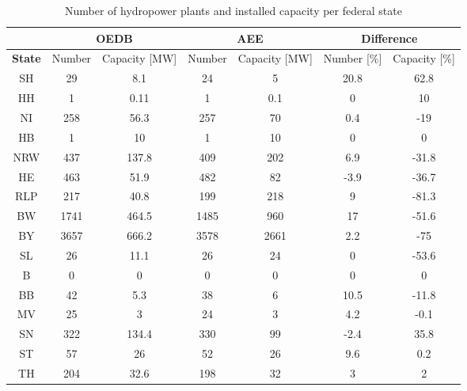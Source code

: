 \begin{table}
\footnotesize 
 \caption[Number of hydropower plants and installed capacity per federal state]{Number of hydropower plants and installed capacity per federal state \cite{oedb}\cite{aee}}
 \centering
 \label{oedb_aee_diff}
 \begin{tabular}{|c|cc|cc| cc|}
  \cline{2-7}
  \multicolumn{0}{c|}{} &\multicolumn{2}{|c}{\textbf{OEDB}}&\multicolumn{2}{|c|}{\textbf{AEE}}&\multicolumn{2}{c|}{\textbf{Difference}} \\
  \hline
  \textbf{State} & Number 	& 	Capacity [MW] 	&	Number 	& 	Capacity [MW] 	&	Number [\%] 	&	Capacity [\%] \\
  \hline
  SH	&	29	&	8.1		&	24	&	5		&	20.8		&	62.8	\\
  HH	&	1	&	0.11		&	1	&	0.1		&	0		&	10	\\
  NI	&	258	&	56.3		&	257	&	70		&	0.4		&	-19	\\
  HB	&	1	&	10		&	1	&	10		&	0		&	0	\\
  NRW	&	437	&	137.8		&	409	&	202		&	6.9		&	-31.8	\\
  HE	&	463	&	51.9		&	482	&	82		&	-3.9		&	-36.7	\\
  RLP	&	217	&	40.8		&	199	&	218		&	9		&	-81.3	\\
  BW	&	1741	&	464.5		&	1485	&	960		&	17		&	-51.6	\\	
  BY	&	3657	&	666.2		&	3578	&	2661		&	2.2		&	-75	\\
  SL	&	26	&	11.1		&	26	&	24		&	0		&	-53.6	\\
  B	&	0	&	0		&	0	&	0		&	0		&	0	\\
  BB	&	42	&	5.3		&	38	&	6		&	10.5		&	-11.8	\\
  MV	&	25	&	3		&	24	&	3		&	4.2		&	-0.1	\\
  SN	&	322	&	134.4		&	330	&	99		&	-2.4		&	35.8	\\
  ST	&	57	&	26		&	52	&	26		&	9.6		&	0.2	\\
  TH	&	204	&	32.6		&	198	&	32		&	3		&	2	\\
  \hline
 \end{tabular} 
\end{table}




